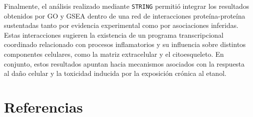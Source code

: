 \documentclass[
  9pt,
]{article}
\begin{document}
Finalmente, el análisis realizado mediante \texttt{STRING} permitió
integrar los resultados obtenidos por GO y GSEA dentro de una red de
interacciones proteína-proteína sustentadas tanto por evidencia
experimental como por asociaciones inferidas. Estas interacciones
sugieren la existencia de un programa transcripcional coordinado
relacionado con procesos inflamatorios y su influencia sobre distintos
componentes celulares, como la matriz extracelular y el citoesqueleto.
En conjunto, estos resultados apuntan hacia mecanismos asociados con la
respuesta al daño celular y la toxicidad inducida por la exposición
crónica al etanol.

\newpage

\section{Referencias}\label{referencias}
\end{document}
